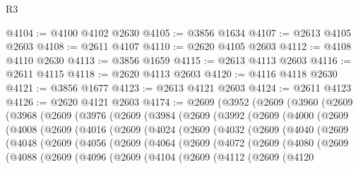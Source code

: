 \begin{lexlean}{R3}
\begin{coremodule}
@4104 := @4100 @4102 @2630
@4105 := @3856 @1634
@4107 := @2613 @4105 @2603
@4108 := @2611 @4107
@4110 := @2620 @4105 @2603
@4112 := @4108 @4110 @2630
@4113 := @3856 @1659
@4115 := @2613 @4113 @2603
@4116 := @2611 @4115
@4118 := @2620 @4113 @2603
@4120 := @4116 @4118 @2630
@4121 := @3856 @1677
@4123 := @2613 @4121 @2603
@4124 := @2611 @4123
@4126 := @2620 @4121 @2603
@4174 := @2609
    (@3952
      (@2609
        (@3960
          (@2609
            (@3968
              (@2609
                (@3976
                  (@2609
                    (@3984
                      (@2609
                        (@3992
                          (@2609
                            (@4000
                              (@2609
                                (@4008
                                  (@2609
                                    (@4016
                                      (@2609
                                        (@4024
                                          (@2609
                                            (@4032
                                              (@2609
                                                (@4040
                                                  (@2609
                                                    (@4048
                                                      (@2609
                                                        (@4056
                                                          (@2609
                                                            (@4064
                                                              (@2609
                                                                (@4072
                                                                  (@2609
                                                                    (@4080
                                                                      (@2609
                                                                        (@4088
                                                                          (@2609
                                                                            (@4096
                                                                              (@2609
                                                                                (@4104
                                                                                  (@2609
                                                                                    (@4112
                                                                                      (@2609
                                                                                        (@4120

\end{coremodule}
\end{lexlean}
